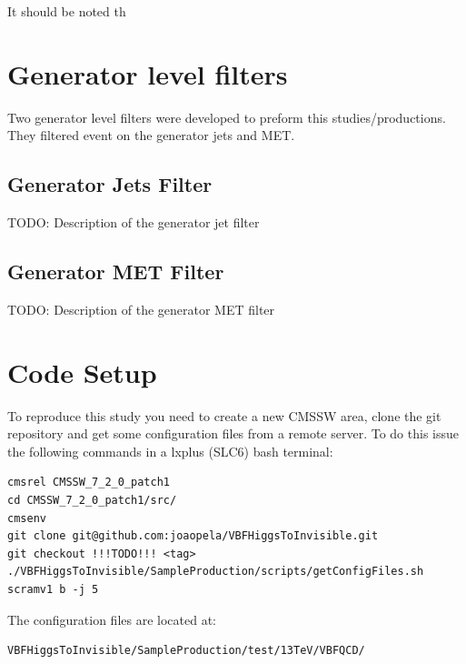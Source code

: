 \documentclass[a4paper]{article}
\begin{document}
It should be noted th




\section{Generator level filters}

Two generator level filters were developed to preform this studies/productions. They filtered event on the generator jets and MET.

\subsection{Generator Jets Filter}

TODO: Description of the generator jet filter

\subsection{Generator MET Filter}

TODO: Description of the generator MET filter 

\newpage
\appendix
\section{Code Setup}

To reproduce this study you need to create a new CMSSW area, clone the git repository and get some configuration files from a remote server. To do this issue the following commands in a lxplus (SLC6) bash terminal:

\lstset{
  language=bash,
  basicstyle=\footnotesize, 
  breaklines=true
}
\begin{framed}
\begin{lstlisting}
cmsrel CMSSW_7_2_0_patch1
cd CMSSW_7_2_0_patch1/src/
cmsenv
git clone git@github.com:joaopela/VBFHiggsToInvisible.git
git checkout !!!TODO!!! <tag>
./VBFHiggsToInvisible/SampleProduction/scripts/getConfigFiles.sh
scramv1 b -j 5
\end{lstlisting}
\end{framed}

The configuration files are located at:

\begin{framed}
\begin{lstlisting}
VBFHiggsToInvisible/SampleProduction/test/13TeV/VBFQCD/
\end{lstlisting}
\end{framed}
\end{document}
